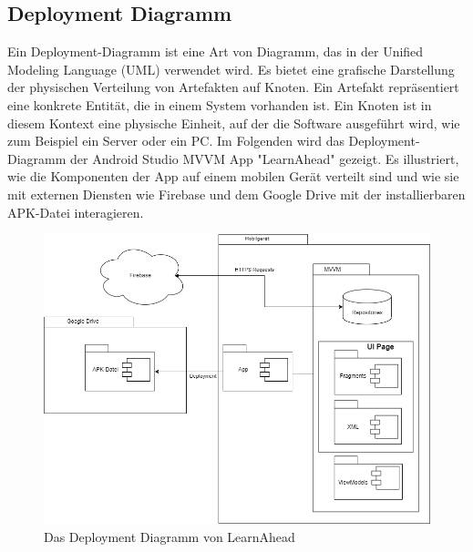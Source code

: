 \subsection{Deployment Diagramm} \label{Deployment Diagramm}
Ein Deployment-Diagramm ist eine Art von Diagramm, das in der Unified Modeling Language (UML) verwendet wird. Es bietet eine grafische Darstellung der physischen Verteilung von Artefakten auf Knoten. Ein Artefakt repräsentiert eine konkrete Entität, die in einem System vorhanden ist. Ein Knoten ist in diesem Kontext eine physische Einheit, auf der die Software ausgeführt wird, wie zum Beispiel ein Server oder ein PC.\newline
Im Folgenden wird das Deployment-Diagramm der Android Studio MVVM App "LearnAhead" gezeigt. Es illustriert, wie die Komponenten der App auf einem mobilen Gerät verteilt sind und wie sie mit externen Diensten wie Firebase und dem Google Drive mit der installierbaren APK-Datei interagieren.\newline
\begin{figure}[H]
    \centering
    \includegraphics[width=1\textwidth]{images/diagramme/DeploymentDiagramm.png}
    \caption{Das Deployment Diagramm von LearnAhead}
    \label{fig:DeploymentDiagramm}
\end{figure}


